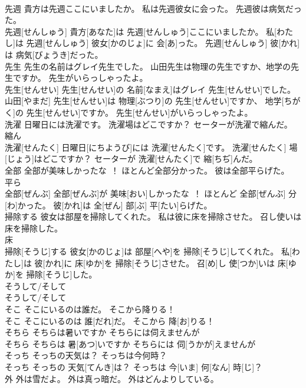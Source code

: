 \documentclass[8pt]{extreport}
\begin{document}
\begin{CJK}{UTF8}{min}
\\	先週 貴方は先週ここにいましたか。 私は先週彼女に会った。 先週彼は病気だった。	
\\	先週[せんしゅう] 貴方[あなた]は 先週[せんしゅう]ここにいましたか。 私[わたし]は 先週[せんしゅう] 彼女[かのじょ]に 会[あ]った。 先週[せんしゅう] 彼[かれ]は 病気[びょうき]だった。
\\	先生 先生の名前はグレイ先生でした。 山田先生は物理の先生ですか、地学の先生ですか。 先生がいらっしゃったよ。	
\\	先生[せんせい] 先生[せんせい]の 名前[なまえ]はグレイ 先生[せんせい]でした。 山田[やまだ] 先生[せんせい]は 物理[ぶつり]の 先生[せんせい]ですか、 地学[ちがく]の 先生[せんせい]ですか。 先生[せんせい]がいらっしゃったよ。
\\	洗濯 日曜日には洗濯です。 洗濯場はどこですか？ セーターが洗濯で縮んだ。	
\\	縮ん 
\\	洗濯[せんたく] 日曜日[にちようび]には 洗濯[せんたく]です。 洗濯[せんたく] 場[じょう]はどこですか？ セーターが 洗濯[せんたく]で 縮[ちぢ]んだ。
\\	全部 全部が美味しかったな~！ ほとんど全部分かった。 彼は全部平らげた。	
\\	平ら 
\\	全部[ぜんぶ] 全部[ぜんぶ]が 美味[おい]しかったな~！ ほとんど 全部[ぜんぶ] 分[わ]かった。 彼[かれ]は 全[ぜん] 部[ぶ] 平[たい]らげた。
\\	掃除する 彼女は部屋を掃除してくれた。 私は彼に床を掃除させた。 召し使いは床を掃除した。	
\\	床 
\\	掃除[そうじ]する 彼女[かのじょ]は 部屋[へや]を 掃除[そうじ]してくれた。 私[わたし]は 彼[かれ]に 床[ゆか]を 掃除[そうじ]させた。 召[め]し 使[つか]いは 床[ゆか]を 掃除[そうじ]した。
\\	そうして/そして	
\\	そうして/そして
\\	そこ そこにいるのは誰だ。 そこから降りる！	
\\	そこ そこにいるのは 誰[だれ]だ。 そこから 降[お]りる！
\\	そちら そちらは暑いですか そちらには伺えませんが	
\\	そちら そちらは 暑[あつ]いですか そちらには 伺[うかが]えませんが
\\	そっち そっちの天気は？ そっちは今何時？	
\\	そっち そっちの 天気[てんき]は？ そっちは 今[いま] 何[なん] 時[じ]？
\\	外 外は雪だよ。 外は真っ暗だ。 外はどんよりしている。	

\end{CJK}
\end{document}
